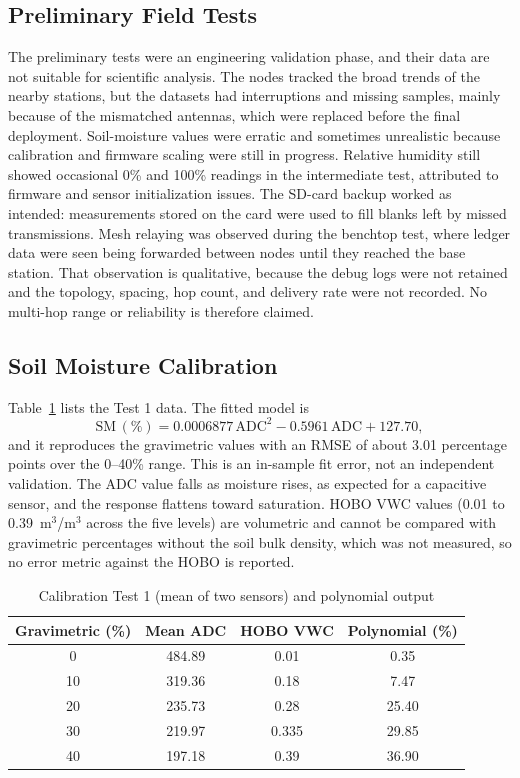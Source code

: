 \subsection{Preliminary Field Tests}
The preliminary tests were an engineering validation phase, and their data are not suitable for scientific analysis. The nodes tracked the broad trends of the nearby stations, but the datasets had interruptions and missing samples, mainly because of the mismatched antennas, which were replaced before the final deployment. Soil-moisture values were erratic and sometimes unrealistic because calibration and firmware scaling were still in progress. Relative humidity still showed occasional 0\% and 100\% readings in the intermediate test, attributed to firmware and sensor initialization issues. The SD-card backup worked as intended: measurements stored on the card were used to fill blanks left by missed transmissions. Mesh relaying was observed during the benchtop test, where ledger data were seen being forwarded between nodes until they reached the base station. That observation is qualitative, because the debug logs were not retained and the topology, spacing, hop count, and delivery rate were not recorded. No multi-hop range or reliability is therefore claimed.

\subsection{Soil Moisture Calibration}
Table~\ref{tab:calib} lists the Test 1 data. The fitted model is
\begin{equation}
\text{SM}\,(\%)=0.0006877\,\text{ADC}^{2}-0.5961\,\text{ADC}+127.70,
\label{eq:poly}
\end{equation}
and it reproduces the gravimetric values with an RMSE of about 3.01 percentage points over the 0--40\% range. This is an in-sample fit error, not an independent validation. The ADC value falls as moisture rises, as expected for a capacitive sensor, and the response flattens toward saturation. HOBO VWC values (0.01 to 0.39~m$^3$/m$^3$ across the five levels) are volumetric and cannot be compared with gravimetric percentages without the soil bulk density, which was not measured, so no error metric against the HOBO is reported.

\begin{table}[!t]
\renewcommand{\arraystretch}{1.1}
\caption{Calibration Test 1 (mean of two sensors) and polynomial output}
\label{tab:calib}
\centering
\footnotesize
\setlength{\tabcolsep}{4pt}
\begin{tabular}{cccc}
\toprule
Gravimetric (\%) & Mean ADC & HOBO VWC & Polynomial (\%) \\
\midrule
0 & 484.89 & 0.01 & 0.35 \\
10 & 319.36 & 0.18 & 7.47 \\
20 & 235.73 & 0.28 & 25.40 \\
30 & 219.97 & 0.335 & 29.85 \\
40 & 197.18 & 0.39 & 36.90 \\
\bottomrule
\end{tabular}
\end{table}

